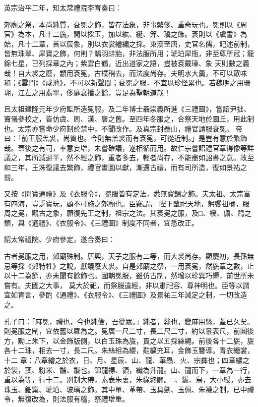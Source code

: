 \begin{pinyinscope}
 英宗治平二年，知太常禮院李育奏曰：



 郊廟之祭，本尚純質，袞冕之飾，皆存法象，非事繁侈、重奇玩也。冕則以《周官》為本，凡十二旒，間以採玉，加以紘、綖、笄、瑱之飾。袞則以《虞書》為始，凡十二章，首以辰象，別以衣裳繪繡之採。東漢至唐，史官名儒，記述前制，皆無珠翠、犀寶之飾，何則？鷸羽蚌胎，非法服所用；琥珀犀瓶，非至尊所冠；龍錦七星，已列採章之內；紫雲白鶴，近出道家之語，豈被袞戴璪、象
 天則數之義哉！自大裘之廢，顓用袞冕，古樸稍去，而法度尚存。夫明水大羹，不可以眾味和；《雲門》《咸池》，不可以新聲間；袞冕之服，不宜以珍怪累也。若魏明之用珊瑚，江左之用翡翠，侈靡衰播之餘，豈足為聖朝道哉！



 且太祖建隆元年少府監所造冕服，及二年博士聶崇義所進《三禮圖》，嘗詔尹拙、竇儀參校之，皆仿虞、周、漢、唐之舊。至四年冬服之，合祭天地於圜丘，用此制也。太宗亦嘗命少府制於禁中，不聞改作。及真宗封泰山，禮官請服袞冕。
 帝曰：「前王服羔裘，尚質也。今則無羔裘而有袞冕，可從近制。」是豈有意於繁飾哉。蓋後之有司，率意妄增，未嘗確議，遂相循而用。故仁宗嘗詔禮官章得像等詳議之，其所減過半，然不經之飾，重者多去，輕者尚存，不能盡如詔書之意。故至和三年，王洙復議去繁飾，禮官畫圖以獻，漸還古禮，而有司所造，復如景祐之前。



 又按《開寶通禮》及《衣服令》，冕服皆有定法，悉無寶錦之飾。夫太祖、太宗富有四海，豈乏寶玩，顧不可施之郊廟也。臣竊謂，
 陛下肇祀天地，躬饗祖檷，服周之冕，觀古之象，願復先王之制，祖宗之法。其袞冕之服，及□、綬、佩、舄之類，與《通禮》、《衣服令》、《三禮圖》制度不同者，宜悉改正。



 詔太常禮院、少府參定，遂合奏曰：



 古者冕服之用，郊廟殊制。唐興，天子之服有二等，而大裘尚存。顯慶初，長孫無忌等採《郊特牲》之說，獻議廢大裘。自是郊廟之祭，一用袞冕，然旒章之數，止以十二為節，亦未聞有餘飾也。國朝冕服，雖仿古制，然增以珍異巧縟，前世所未嘗有。夫國之大事，
 莫大於祀，而祭服違經，非以肅祀容、尊神明也。臣等以謂宜如育言，參酌《通禮》、《衣服令》、《三禮圖》及景祐三年減定之制，一切改造之。



 孔子曰：「麻冕，禮也，今也純儉，吾從眾。」純者，絲也，變麻用絲，蓋已久矣。則冕服之制，宜依舊以羅為之。冕廣一尺二寸，長二尺二寸，約以景表尺，前圓後方，黝上朱下，以金飾版側，以白玉珠為旒，貫之以五採絲繩。前後各十二旒，旒各十二珠，相去一寸，長二尺。朱絲組為纓，黈纊充耳，金飾玉簪導。青衣纁裳，十二
 章：八章繪之於衣，日、月、星辰、山、龍、華蟲、火、宗彞也；四章繡之於裳，藻、粉米、黼、黻也。錦龍褾、領，織為升龍。山、龍而下，一章為一行，重以為等，行十二。別制大帶，素表朱裏，朱綠終闢。□、紱、舄，大小綬，亦去珠玉、鈿窠、琥珀、玻璃之飾。其中單、革帶、玉具劍、玉佩、朱襪之制，已中禮令，無復改為，則法服有稽，祭禮增重。




\end{pinyinscope}
